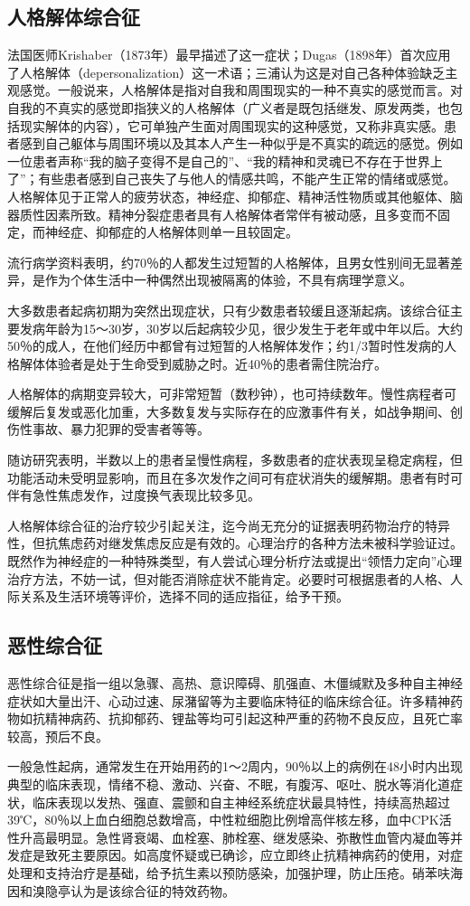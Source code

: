 \subsection{人格解体综合征}

法国医师Krishaber（1873年）最早描述了这一症状；Dugas（1898年）首次应用了人格解体（depersonalization）这一术语；三浦认为这是对自己各种体验缺乏主观感觉。一般说来，人格解体是指对自我和周围现实的一种不真实的感觉而言。对自我的不真实的感觉即指狭义的人格解体（广义者是既包括继发、原发两类，也包括现实解体的内容），它可单独产生面对周围现实的这种感觉，又称非真实感。患者感到自己躯体与周围环境以及其本人产生一种似乎是不真实的疏远的感觉。例如一位患者声称“我的脑子变得不是自己的”、“我的精神和灵魂已不存在于世界上了”；有些患者感到自己丧失了与他人的情感共鸣，不能产生正常的情绪或感觉。人格解体见于正常人的疲劳状态，神经症、抑郁症、精神活性物质或其他躯体、脑器质性因素所致。精神分裂症患者具有人格解体者常伴有被动感，且多变而不固定，而神经症、抑郁症的人格解体则单一且较固定。

流行病学资料表明，约70％的人都发生过短暂的人格解体，且男女性别间无显著差异，是作为个体生活中一种偶然出现被隔离的体验，不具有病理学意义。

大多数患者起病初期为突然出现症状，只有少数患者较缓且逐渐起病。该综合征主要发病年龄为15～30岁，30岁以后起病较少见，很少发生于老年或中年以后。大约50％的成人，在他们经历中都曾有过短暂的人格解体发作；约1/3暂时性发病的人格解体体验者是处于生命受到威胁之时。近40％的患者需住院治疗。

人格解体的病期变异较大，可非常短暂（数秒钟），也可持续数年。慢性病程者可缓解后复发或恶化加重，大多数复发与实际存在的应激事件有关，如战争期间、创伤性事故、暴力犯罪的受害者等等。

随访研究表明，半数以上的患者呈慢性病程，多数患者的症状表现呈稳定病程，但功能活动未受明显影响，而且在多次发作之间可有症状消失的缓解期。患者有时可伴有急性焦虑发作，过度换气表现比较多见。

人格解体综合征的治疗较少引起关注，迄今尚无充分的证据表明药物治疗的特异性，但抗焦虑药对继发焦虑反应是有效的。心理治疗的各种方法未被科学验证过。既然作为神经症的一种特殊类型，有人尝试心理分析疗法或提出“领悟力定向”心理治疗方法，不妨一试，但对能否消除症状不能肯定。必要时可根据患者的人格、人际关系及生活环境等评价，选择不同的适应指征，给予干预。

\subsection{恶性综合征}

恶性综合征是指一组以急骤、高热、意识障碍、肌强直、木僵缄默及多种自主神经症状如大量出汗、心动过速、尿潴留等为主要临床特征的临床综合征。许多精神药物如抗精神病药、抗抑郁药、锂盐等均可引起这种严重的药物不良反应，且死亡率较高，预后不良。

一般急性起病，通常发生在开始用药的1～2周内，90％以上的病例在48小时内出现典型的临床表现，情绪不稳、激动、兴奋、不眠，有腹泻、呕吐、脱水等消化道症状，临床表现以发热、强直、震颤和自主神经系统症状最具特性，持续高热超过39℃，80％以上血白细胞总数增高，中性粒细胞比例增高伴核左移，血中CPK活性升高最明显。急性肾衰竭、血栓塞、肺栓塞、继发感染、弥散性血管内凝血等并发症是致死主要原因。如高度怀疑或已确诊，应立即终止抗精神病药的使用，对症处理和支持治疗是基础，给予抗生素以预防感染，加强护理，防止压疮。硝苯呋海因和溴隐亭认为是该综合征的特效药物。